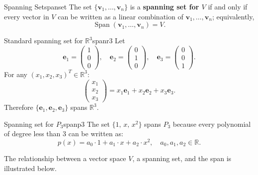 \documentclass[12pt,a4paper]{article}
\newcommand{\R}{\mathbb{R}}
\newcommand{\vv}[1]{\mathbf{#1}}
\DeclareMathOperator{\Span}{Span}
\begin{document}
\begin{definition}{Spanning Set}{spanset}
  The set $\{\vv{v}_1, \ldots, \vv{v}_n\}$ is a \textbf{spanning set for $V$}
  if and only if every vector in $V$ can be written as a linear combination of
  $\vv{v}_1, \ldots, \vv{v}_n$; equivalently,
  \[
    \Span(\vv{v}_1, \ldots, \vv{v}_n) = V.
  \]
\end{definition}

\begin{example}{Standard spanning set for $\R^3$}{spanr3}
  Let
  \[
    \vv{e}_1 = \begin{pmatrix}1\\0\\0\end{pmatrix}, \quad
    \vv{e}_2 = \begin{pmatrix}0\\1\\0\end{pmatrix}, \quad
    \vv{e}_3 = \begin{pmatrix}0\\0\\1\end{pmatrix}.
  \]
  For any $(x_1, x_2, x_3)^T \in \R^3$:
  \[
    \begin{pmatrix}x_1\\x_2\\x_3\end{pmatrix}
    = x_1\vv{e}_1 + x_2\vv{e}_2 + x_3\vv{e}_3.
  \]
  Therefore $\{\vv{e}_1, \vv{e}_2, \vv{e}_3\}$ spans $\R^3$.
\end{example}

\begin{example}{Spanning set for $P_3$}{spanp3}
  The set $\{1,\, x,\, x^2\}$ spans $P_3$ because every polynomial of degree
  less than 3 can be written as:
  \[
    p(x) = a_0 \cdot 1 + a_1 \cdot x + a_2 \cdot x^2,
    \quad a_0, a_1, a_2 \in \R.
  \]
\end{example}

\noindent
The relationship between a vector space $V$, a spanning set, and the span is
illustrated below.
\end{document}
